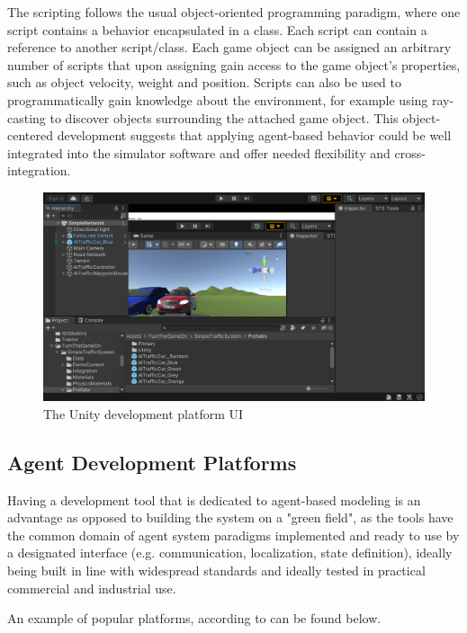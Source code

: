 \documentclass[0main.tex]{subfiles}
\begin{document}
The scripting follows the usual object-oriented programming paradigm, where one script contains a
behavior encapsulated in a class. Each script can contain a reference to another
script/class. Each game object can be assigned an arbitrary number of scripts that upon 
assigning gain access to the game object's properties, such as object velocity, weight and position. 
Scripts can also be used to programmatically gain knowledge about the environment, for example 
using ray-casting to discover objects surrounding the attached game object. This object-centered 
development suggests that applying agent-based behavior could be well integrated into the 
simulator software and offer needed flexibility and cross-integration.

\begin{figure}[htbp]
    \centering
    \includegraphics[width=.9\textwidth]{unityUI.png}
    \caption{The Unity development platform UI}
    \label{fig-unity}
\end{figure}

\subsection{Agent Development Platforms}

Having a development tool that is dedicated to agent-based modeling is an advantage as opposed to building the 
system on a "green field", as the tools have the common domain of agent system paradigms implemented and ready 
to use by a designated interface (e.g. communication, localization, state definition), ideally being built in line 
with widespread standards and ideally tested in practical commercial and industrial use. 

An example of popular platforms, according to \cite{Binder2022} can be found below. 
\end{document}
